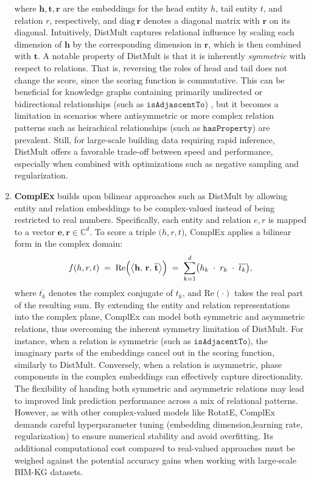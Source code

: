 \begin{enumerate}
where \(\mathbf{h}, \mathbf{t}, \mathbf{r}\) are the embeddings for the head entity \(h\), tail entity
\(t\), and relation \(r\), respectively, and \(\text{diag}\,\mathbf{r}\) denotes a diagonal matrix with
\(\mathbf{r}\) on its diagonal. Intuitively, DistMult captures relational influence by scaling each
dimension of \(\mathbf{h}\) by the corresponding dimension in \(\mathbf{r}\), which is then combined
with \(\mathbf{t}\). A notable property of DistMult is that it is inherently \emph{symmetric} with respect to
relations. That is, reversing the roles of head and tail does not change the score, since the
scoring function is commutative. This can be beneficial for knowledge graphs containing
primarily undirected or bidirectional relationships (such as \(\texttt{isAdjascentTo}\)) , but it becomes a limitation in scenarios
where antisymmetric or more complex relation patterns such as heirachical relationships (such as \(\texttt{hasProperty}\)) are prevalent. Still, for large-scale
building data requiring rapid inference, DistMult offers a favorable trade-off between speed
and performance, especially when combined with optimizations such as negative sampling and regularization. 

    \item
    \textbf{ComplEx} builds upon bilinear approaches such
as DistMult by allowing entity and relation embeddings to be complex-valued instead of being
restricted to real numbers. Specifically, each entity and relation \(e, r\) is mapped to a vector
\(\mathbf{e}, \mathbf{r} \in \mathbb{C}^d\). To score a triple \(\bigl(h, r, t\bigr)\), ComplEx applies
a bilinear form in the complex domain:
\[
  f(h, r, t)
  \;=\;
  \mathrm{Re}\Bigl(\bigl\langle \mathbf{h},\, \mathbf{r},\, \overline{\mathbf{t}} \bigr\rangle\Bigr)
  \;=\;
  \sum_{k=1}^d
  \bigl(h_k \;\cdot\; r_k \;\cdot\; \overline{t_k}\bigr),
\]
where \(\overline{t_k}\) denotes the complex conjugate of \(t_k\), and \(\mathrm{Re}(\cdot)\) takes
the real part of the resulting sum. By extending the entity and relation representations into the complex plane, ComplEx can model both symmetric and asymmetric relations, thus overcoming the inherent symmetry limitation of DistMult. For instance, when a relation is symmetric (such as \(\texttt{isAdjacentTo}\)), the imaginary parts of the embeddings cancel out in the scoring function, similarly to DistMult. Conversely,
when a relation is asymmetric, phase components in the complex embeddings can effectively capture directionality. The flexibility of handing both symmetric and asymmetric relations may lead to improved link prediction performance across a mix of relational patterns. However, as with other complex-valued models
like RotatE, ComplEx demands careful hyperparameter tuning (embedding dimension,learning rate, regularization) to ensure numerical stability and avoid overfitting. Its additional computational cost compared to real-valued approaches must be weighed against the potential accuracy gains when working with large-scale \ac{BIM-KG} datasets.


\end{enumerate}

